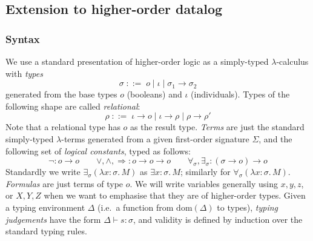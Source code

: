
\newcommand{\abs}[2]{\lambda #1.\,{#2}}

\newcommand{\boolsort}{o}
\newcommand{\intsort}{\iota}
\newcommand{\mng}[1]{\llbracket #1 \rrbracket}
\newcommand{\mmng}[1]{\mathcal{M}\llbracket #1 \rrbracket}
\newcommand{\cmng}[1]{\mathcal{C}\llbracket #1 \rrbracket}
\newcommand{\smng}[1]{\mathcal{S}\llbracket #1 \rrbracket}
\newcommand{\makeset}[1]{\{#1\}}
\newcommand{\disjointTimesS}{\disjointTimes_S}
\newcommand{\superposeS}{{\superpose_S}}
\newcommand{\twistS}{\cplus_{\superpose_S}}
\newcommand{\lub}{\bigsqcup}
\newcommand{\truetm}{\mathsf{true}}
\newcommand{\falsetm}{\mathsf{false}}
\newcommand{\cTo}{\Rightarrow_{\rm c}}
\newcommand{\mTo}{\Rightarrow_{\rm m}}
\newcommand{\mexistsfn}{\mathsf{mexists}}
\newcommand{\mfunc}{T^\mathcal{M}}
\newcommand{\impliesfn}{\mathsf{implies}}

\newcommand{\andfn}{\mathsf{and}}
\newcommand{\mandfn}{\mathsf{mand}}
\newcommand{\andterm}{\mathsf{and}}
\newcommand{\orfn}{\mathsf{or}}
\newcommand{\morfn}{\mathsf{mor}}
\newcommand{\notfn}{\mathsf{not}}
\newcommand{\existsfn}{\mathsf{exists}}
\newcommand{\forallfn}{\mathsf{forall}}
\newcommand{\dom}{\mathrm{dom}}

\subsection{Extension to higher-order datalog}


\subsubsection{Syntax} 
We use a standard presentation of higher-order logic as a simply-typed $\lambda$-calculus with \emph{types}
\[
\sigma \; ::= \; \boolsort \mid \intsort \mid \sigma_1 \to \sigma_2
\]
generated from the base types $\boolsort$ (booleans) and $\intsort$ (individuals).
Types of the following shape are called \emph{relational}:
\[
\rho \; ::= \; \intsort \to \boolsort \mid \intsort \to \rho \mid \rho \to \rho'
\]
Note that a relational type has $\boolsort$ as the result type.
\emph{Terms} are just the standard simply-typed $\lambda$-terms generated from a given first-order signature $\Sigma$, and the following set of \emph{logical constants}, typed as follows:
\[ \neg : \boolsort \to \boolsort \qquad \vee, \wedge, \Rightarrow : \boolsort \to \boolsort \to \boolsort \qquad \forall_\sigma, \exists_\sigma : (\sigma \to \boolsort) \to \boolsort\]
Standardly we write $\exists_\sigma(\abs{x\!\!:\!\!\sigma}{M})$ as $\exists x\!\!:\!\!\sigma .\, M$; similarly for $\forall_\sigma(\abs{x\!\!:\!\!\sigma}{M})$.
\emph{Formulas} are just terms of type $\boolsort$.
We will write variables generally using $x,y,z$, or $X,Y,Z$ when we want to emphasise that they are of higher-order types.
Given a typing environment $\Delta$ (i.e.~a function from $\dom(\Delta)$ to types), \emph{typing judgements} have the form $\Delta \vdash s : \sigma$, and validity is defined by induction over the standard typing rules.

